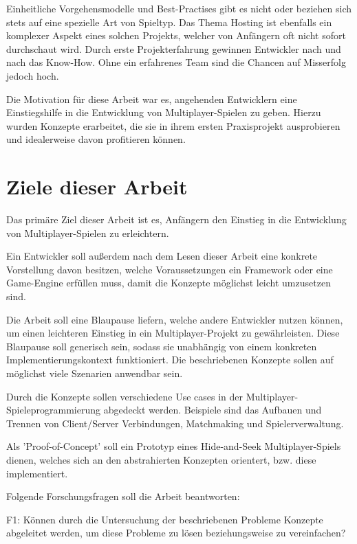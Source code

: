Einheitliche Vorgehensmodelle und Best-Practises gibt es nicht oder beziehen sich stets auf eine spezielle Art von Spieltyp. Das Thema Hosting ist ebenfalls ein komplexer Aspekt eines solchen Projekts, welcher von Anfängern oft nicht sofort durchschaut wird. Durch erste Projekterfahrung gewinnen Entwickler nach und nach das Know-How. Ohne ein erfahrenes Team sind die Chancen auf Misserfolg jedoch hoch. \cite{Payne.18.09.2019}

Die Motivation für diese Arbeit war es, angehenden Entwicklern eine Einstiegshilfe in die Entwicklung von Multiplayer-Spielen zu geben. Hierzu wurden Konzepte erarbeitet, die sie in ihrem ersten Praxisprojekt ausprobieren und idealerweise davon profitieren können.

\section{Ziele dieser Arbeit}

Das primäre Ziel dieser Arbeit ist es, Anfängern den Einstieg in die Entwicklung von Multiplayer-Spielen zu erleichtern.

Ein Entwickler soll außerdem nach dem Lesen dieser Arbeit eine konkrete Vorstellung davon besitzen, welche Voraussetzungen ein Framework oder eine Game-Engine erfüllen muss, damit die Konzepte möglichst leicht umzusetzen sind.

Die Arbeit soll eine Blaupause liefern, welche andere Entwickler nutzen können, um einen leichteren Einstieg in ein Multiplayer-Projekt zu gewährleisten. Diese Blaupause soll generisch sein, sodass sie unabhängig von einem konkreten Implementierungskontext funktioniert. Die beschriebenen Konzepte sollen auf möglichst viele Szenarien anwendbar sein.

Durch die Konzepte sollen verschiedene Use cases in der Multiplayer-Spieleprogrammierung abgedeckt werden. Beispiele sind das Aufbauen und Trennen von Client/Server Verbindungen, Matchmaking \cite{Wikipedia.2021b} und Spielerverwaltung.

Als 'Proof-of-Concept' soll ein Prototyp eines Hide-and-Seek Multiplayer-Spiels dienen, welches sich an den abstrahierten Konzepten orientert, bzw. diese implementiert.

Folgende Forschungsfragen soll die Arbeit beantworten:

\label{f1} \textsf{\Large F1:} Können durch die Untersuchung der beschriebenen Probleme Konzepte abgeleitet werden, um diese Probleme zu lösen beziehungsweise zu vereinfachen?

